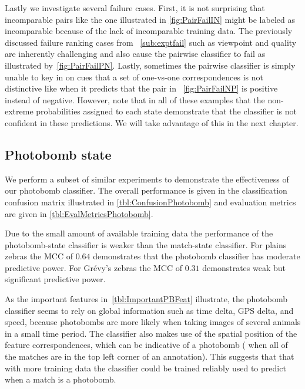         Lastly we investigate several failure cases.
        First, it is not surprising that incomparable pairs like the one illustrated in \cref{fig:PairFailIN}
          might be labeled as incomparable because of the lack of incomparable training data.
        The previously discussed failure ranking cases from ~\cref{sub:exptfail} such as viewpoint and quality
          are inherently challenging and also cause the pairwise classifier to fail as illustrated
          by~\cref{fig:PairFailPN}.
        Lastly, sometimes the pairwise classifier is simply unable to key in on cues that a set of one-vs-one
          correspondences is not distinctive like when it predicts that the pair in ~\cref{fig:PairFailNP} is
          positive instead of negative.
        However, note that in all of these examples that the non-extreme probabilities assigned to each state
          demonstrate that the classifier is not confident in these predictions.
        We will take advantage of this in the next chapter.
        

        \PairFailIN{} 

        \PairFailPN{}

        \PairFailNP{}

        \FloatBarrier{}


    \subsection{Photobomb state}
        We perform a subset of similar experiments to demonstrate the effectiveness of our photobomb classifier.
        The overall performance is given in the classification confusion matrix illustrated in
          \cref{tbl:ConfusionPhotobomb} and evaluation metrics are given in \cref{tbl:EvalMetricsPhotobomb}.

        Due to the small amount of available training data the performance of the photobomb-state classifier is
          weaker than the match-state classifier.
        For plains zebras the MCC of $0.64$ demonstrates that the photobomb classifier has moderate predictive
          power.
        For Grévy's zebras the MCC of $0.31$ demonstrates weak but significant predictive power.

        As the important features in~\cref{tbl:ImportantPBFeat} illustrate, the photobomb classifier seems to
          rely on global information such as time delta, GPS delta, and speed, because photobombs are more likely
          when taking images of several animals in a small time period.
        The classifier also makes use of the spatial position of the feature correspondences, which can be
          indicative of a photobomb (\eg{} when all of the matches are in the top left corner of an annotation).
        This suggests that that with more training data the classifier could be trained reliably used to predict
          when a match is a photobomb.

